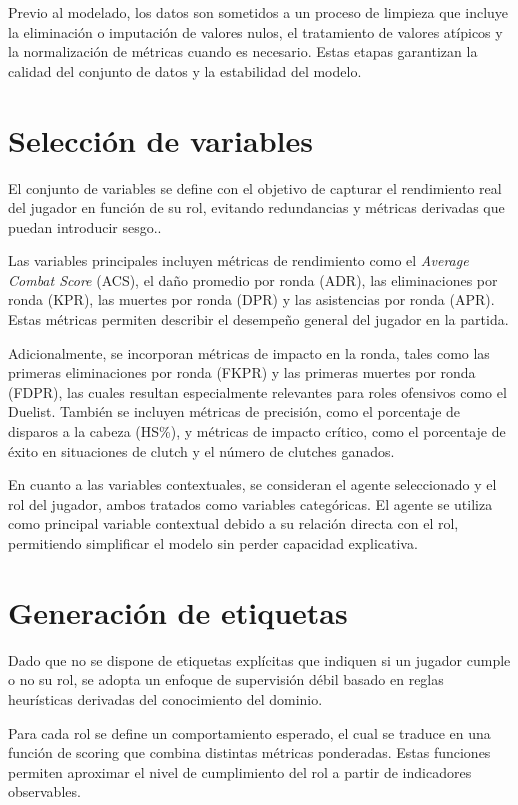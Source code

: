 \documentclass{ULBreport} %
\begin{document}
Previo al modelado, los datos son sometidos a un proceso de limpieza que incluye la eliminación o imputación de valores nulos, el tratamiento de valores atípicos y la normalización de métricas cuando es necesario. Estas etapas garantizan la calidad del conjunto de datos y la estabilidad del modelo.

\section{Selección de variables}

El conjunto de variables se define con el objetivo de capturar el rendimiento real del jugador en función de su rol, evitando redundancias y métricas derivadas que puedan introducir sesgo.\cite{feature_engineering}.

Las variables principales incluyen métricas de rendimiento como el \textit{Average Combat Score} (ACS), el daño promedio por ronda (ADR), las eliminaciones por ronda (KPR), las muertes por ronda (DPR) y las asistencias por ronda (APR). Estas métricas permiten describir el desempeño general del jugador en la partida.

Adicionalmente, se incorporan métricas de impacto en la ronda, tales como las primeras eliminaciones por ronda (FKPR) y las primeras muertes por ronda (FDPR), las cuales resultan especialmente relevantes para roles ofensivos como el Duelist. También se incluyen métricas de precisión, como el porcentaje de disparos a la cabeza (HS\%), y métricas de impacto crítico, como el porcentaje de éxito en situaciones de clutch y el número de clutches ganados.

En cuanto a las variables contextuales, se consideran el agente seleccionado y el rol del jugador, ambos tratados como variables categóricas. El agente se utiliza como principal variable contextual debido a su relación directa con el rol, permitiendo simplificar el modelo sin perder capacidad explicativa.

\section{Generación de etiquetas}

Dado que no se dispone de etiquetas explícitas que indiquen si un jugador cumple o no su rol, se adopta un enfoque de supervisión débil basado en reglas heurísticas derivadas del conocimiento del dominio.

Para cada rol se define un comportamiento esperado, el cual se traduce en una función de scoring que combina distintas métricas ponderadas. Estas funciones permiten aproximar el nivel de cumplimiento del rol a partir de indicadores observables.
\end{document}
